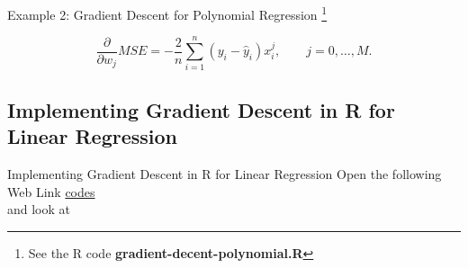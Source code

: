\documentclass[10pt, hyperref={colorlinks = true,linkcolor = blue}]{beamer}
\begin{document}
{{\begin{frame}{Example 2: Gradient Descent for Polynomial Regression \footnote{See the R code \textbf{gradient-decent-polynomial.R}}}
\begin{itemize}[<+->]
\[
\frac{\partial}{\partial w_j} MSE = -\frac{2}{n} \sum_{i=1}^{n} (y_i - \hat{y}_i) x_i^j, \qquad j=0,\ldots,M.
\]
\end{itemize}
\end{frame}
}

{\subsection{Implementing Gradient Descent in R for Linear Regression}\begin{frame}{Implementing Gradient Descent in R for Linear Regression}
Open the following Web Link \href{https://drive.google.com/drive/folders/1YsVuNDuyFx_Er20NPciM6QA0tzRp8_yB}{codes} \\ and look at 

\end{frame}
}
}
\end{document}
